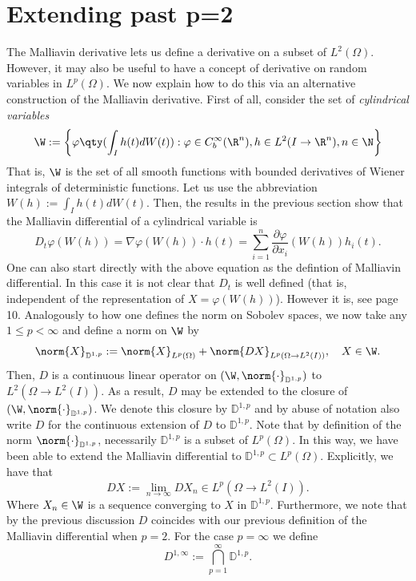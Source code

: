 \documentclass[
    a4paper,
    DIV=14,
    abstract=true,
    numbers=noenddot
]{scrartcl}
\begin{document}
\section{Extending past p=2}
The Malliavin derivative lets us define a derivative on a subset of $L^2(\Omega)$. However, it may also be useful to have a concept of derivative
on random variables in $L^p(\Omega)$. We now explain how to do this via an alternative construction of the Malliavin derivative. First of all, consider the set of \emph{cylindrical variables}
\begin{equation*}
	\W:=\left\{\varphi\qty(\int_{I}h(t) dW(t)):\varphi\in C_b^\infty(\R^n), h\in L^2(I\to\R^n), n \in \N \right\}
\end{equation*}
That is, $\W$ is the set of all smooth functions with bounded derivatives of Wiener integrals of deterministic functions. Let us use the abbreviation  $W(h):=\int_{I}h(t) dW(t)$.
Then, the results in the previous section show that the Malliavin differential of a cylindrical variable is
\begin{equation*}
	D_t\varphi(W(h))=\nabla\varphi(W(h))\cdot h(t)=\sum_{i=1}^{n} \frac{\partial \varphi}{\partial x_i}(W(h))h_i(t).
\end{equation*}
One can also start directly with the above equation as the defintion of Malliavin differential.
In this case it is not clear that $D_t$ is well defined (that is, independent of the representation of  $X=\varphi(W(h))$). However it is, see \cite{hairer2021introduction} page 10.
Analogously to how one defines the norm on Sobolev spaces, we now take any $1\leq p< \infty $ and define a norm on $\W$ by
\begin{equation*}
	\norm{X}_{\mathbb{D}^{1,p}}:=\norm{X}_{L^p(\Omega)}+\norm{DX}_{L^p(\Omega\to L^2(I))},\quad X\in \W.
\end{equation*}
Then, $D$ is a continuous linear operator on $(\W,\norm{\cdot }_{\mathbb{D}^{1,p}})$ to $L^2(\Omega\to L^2(I))$. As a result, $D$ may be extended to the closure of $(\W,\norm{\cdot }_{\mathbb{D}^{1,p}})$. We denote this closure by $\mathbb{D}^{1,p}$ and by abuse of notation also write $D$ for the continuous extension of  $D$ to $\mathbb{D}^{1,p}$. Note that by definition of the norm $\norm{\cdot }_{\mathbb{D}^{1,p}}$, necessarily $\mathbb{D}^{1,p}$ is a subset of $L^p(\Omega)$. In this way, we have been
able to extend the Malliavin differential to $\mathbb{D}^{1,p}\subset L^p(\Omega)$. Explicitly, we have that
\begin{equation*}
	D X:=\lim_{n \to \infty}D X_n \in L^p(\Omega\to L^2(I)).
\end{equation*}
Where $X_n \in \W$ is a sequence converging to  $X$ in  $\mathbb{D}^{1,p}$. Furthermore, we note that by the previous discussion $D$ coincides with our previous definition
of the Malliavin differential when $p=2$. For the case $p=\infty$ we define
\begin{equation*}
	D^{1,\infty}:=\bigcap_{p=1} ^\infty \mathbb{D}^{1,p}.
\end{equation*}
\end{document}
